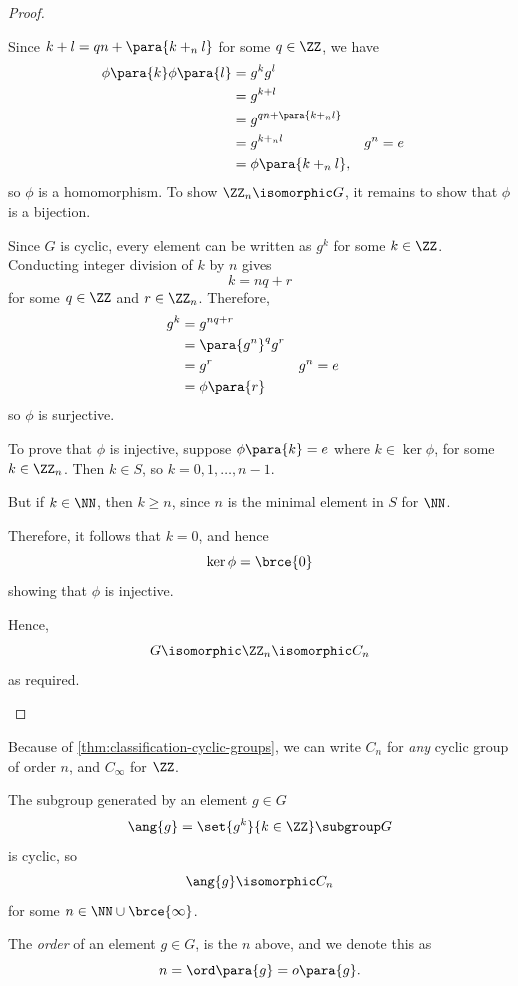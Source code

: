 \begin{proof}
\begin{itemize}
        Since \(k + l = qn + \para{k +_n l}\) for some \(q \in \ZZ\), we have
        \begin{align*}
            \phi \para{k} \phi \para{l} &= g^k g^l \\
            &= g^{k + l} \\
            &= g^{qn + \para{k +_n l}} \\
            &= g^{k +_n l} && g^n = e \\
            &= \phi \para{k +_n l},
        \end{align*}
        so \(\phi\) is a homomorphism. To show \(\ZZ_n \isomorphic G\), it remains to show that \(\phi\) is a bijection.

        Since \(G\) is cyclic, every element can be written as \(g^k\) for some \(k \in \ZZ\). Conducting integer division of \(k\) by \(n\) gives
        \[
            k = nq + r
        \]
        for some \(q \in \ZZ\) and \(r \in \ZZ_n\). Therefore,
        \begin{align*}
            g^k &= g^{nq + r} \\
            &= \para{g^n}^q g^r \\
            &= g^r && g^n = e \\
            &= \phi\para{r}
        \end{align*}
        so \(\phi\) is surjective.

        To prove that \(\phi\) is injective, suppose \(\phi\para{k} = e\) where \(k \in \ker \phi\), for some \(k \in \ZZ_{n}\). Then \(k \in S\), so \(k = 0, 1, \ldots, n - 1\).

        But if \(k \in \NN\), then \(k \geq n\), since \(n\) is the minimal element in \(S\) for \(\NN\).

        Therefore, it follows that \(k = 0\), and hence
        \[
            \ker \phi = \brce{0}
        \]
        showing that \(\phi\) is injective.

        Hence,
        \[
            G \isomorphic \ZZ_n \isomorphic C_n
        \]
        as required.
    \end{itemize}
\end{proof}

Because of \autoref{thm:classification-cyclic-groups}, we can write \(C_n\) for \emph{any} cyclic group of order \(n\), and \(C_\infty\) for \(\ZZ\).

\begin{definition}
    \label{def:order-of-element}%
    The subgroup generated by an element \(g \in G\)
    \[
        \ang{g} = \set{g^k}{k \in \ZZ} \subgroup G
    \]
    is cyclic, so
    \[
        \ang{g} \isomorphic C_n
    \]
    for some \(n \in \NN \cup \brce{\infty}\).

    The \emph{order} of an element \(g \in G\), is the \(n\) above, and we denote this as
    \[
        n = \ord \para{g} = o\para{g}.
    \]
\end{definition}

